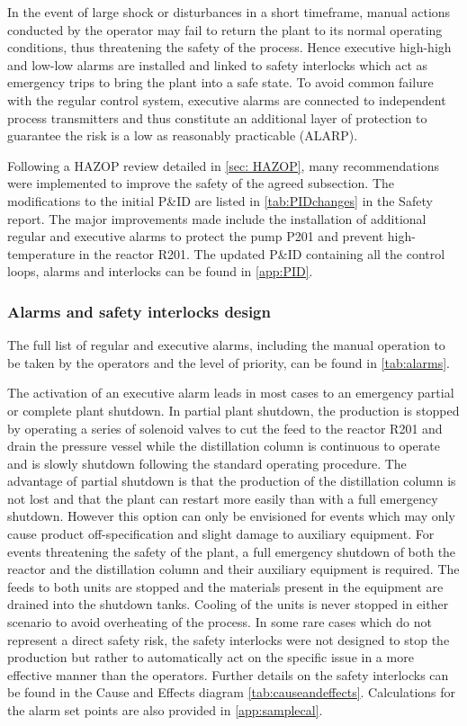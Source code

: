 In the event of large shock or disturbances in a short timeframe, manual actions conducted by the operator may fail to return the plant to its normal operating conditions, thus threatening the safety of the process. Hence executive high-high and low-low alarms are installed and linked to safety interlocks which act as emergency trips to bring the plant into a safe state. To avoid common failure with the regular control system, executive alarms are connected to independent process transmitters and thus constitute an additional layer of protection to guarantee the risk is a low as reasonably practicable (ALARP).  

Following a HAZOP review detailed in \cref{sec: HAZOP}, many recommendations were implemented to improve the safety of the agreed subsection. The modifications to the initial P\&ID are listed in \cref{tab:PIDchanges} in the Safety report. The major improvements made include the installation of additional regular and executive alarms to protect the pump P201 and prevent high-temperature in the reactor R201. The updated P\&ID containing all the control loops, alarms and interlocks can be found in \cref{app:PID}.
 

\subsubsection{Alarms and safety interlocks design}

The full list of regular and executive alarms, including the manual operation to be taken by the operators and the level of priority, can be found in \cref{tab:alarms}. 

The activation of an executive alarm leads in most cases to an emergency partial or complete plant shutdown. In partial plant shutdown, the production is stopped by operating a series of solenoid valves to cut the feed to the reactor R201 and drain the pressure vessel while the distillation column is continuous to operate and is slowly shutdown following the standard operating procedure. The advantage of partial shutdown is that the production of the distillation column is not lost and that the plant can restart more easily than with a full emergency shutdown. However this option can only be envisioned for events which may only cause product off-specification and slight damage to auxiliary equipment. For events threatening the safety of the plant, a full emergency shutdown of both the reactor and the distillation column and their auxiliary equipment is required. The feeds to both units are stopped and the materials present in the equipment are drained into the shutdown tanks. Cooling of the units is never stopped in either scenario to avoid overheating of the process. In some rare cases which do not represent a direct safety risk, the safety interlocks were not designed to stop the production but rather to automatically act on the specific issue in a more effective manner than the operators. Further details on the safety interlocks can be found in the Cause and Effects diagram \cref{tab:causeandeffects}. Calculations for the alarm set points are also provided in \cref{app:samplecal}.


